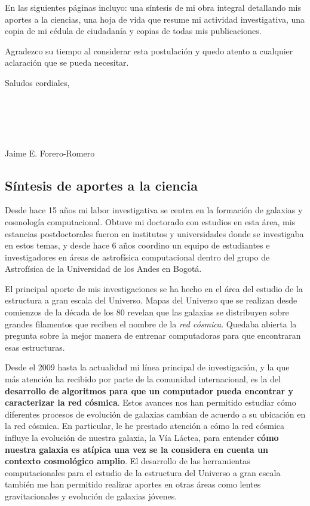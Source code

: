 \documentclass{book}
\begin{document}
En las siguientes p\'aginas incluyo: una s\'intesis de mi obra
integral detallando mis aportes a la ciencias, una hoja de vida que
resume mi actividad investigativa, una copia de mi c\'edula de
ciudadan\'ia y copias de todas mis publicaciones.

Agradezco su tiempo al considerar esta postulaci\'on y quedo atento a
cualquier aclaraci\'on que se pueda necesitar.

Saludos cordiales,
\\
\\
\\
\\
\\
\\
\vspace{2cm}
\noindent
Jaime E. Forero-Romero

\newpage

\subsection*{S\'intesis de aportes a la ciencia}

Desde hace 15 a\~nos mi labor investigativa se centra en la
formaci\'on de galaxias y cosmolog\'ia computacional. Obtuve mi
doctorado con estudios en esta \'area, mis estancias postdoctorales
fueron en institutos y universidades donde se investigaba en estos
temas, y desde hace 6 a\~nos coordino un equipo de estudiantes e
investigadores en \'areas de astrof\'isica computacional dentro del
grupo de Astrof\'isica de la Universidad de los Andes en Bogot\'a.  

El principal aporte de mis investigaciones se ha hecho en el \'area
del estudio de la estructura a gran escala del Universo. Mapas del
Universo que se realizan desde comienzos de la d\'ecada de los 80
revelan que las galaxias se distribuyen sobre grandes filamentos que
reciben el nombre de la \emph{red c\'osmica}. Quedaba abierta la
pregunta sobre la mejor manera de entrenar computadoras para que
encontraran esas estructuras.

Desde el 2009 hasta la actualidad mi l\'inea principal de
investigaci\'on, y la que m\'as atenci\'on ha recibido por parte de la
comunidad internacional, es la del {\bf desarrollo de algoritmos para que
un computador pueda encontrar y caracterizar la red c\'osmica}. 
Estos avances nos han permitido estudiar
c\'omo diferentes procesos de evoluci\'on de galaxias cambian de
acuerdo a su ubicaci\'on en la red c\'osmica. En particular, le he
prestado atenci\'on a c\'omo la red c\'osmica influye la evoluci\'on
de nuestra galaxia, la V\'ia L\'actea, para entender {\bf c\'omo nuestra
galaxia es at\'ipica una vez se la considera en cuenta un contexto
cosmol\'ogico amplio}. 
El desarrollo de las herramientas computacionales para el estudio de
la estructura del Universo a gran escala tambi\'en me han permitido
realizar aportes en otras \'areas como lentes gravitacionales y 
evoluci\'on de galaxias j\'ovenes. 
\end{document}
